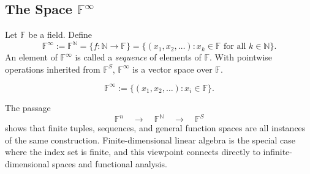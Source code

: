 \subsection{The Space $\mathbb{F}^{\infty}$}

\begin{definition}
\label{def:sequence-space}
Let $\mathbb{F}$ be a field. Define
\[
\mathbb{F}^{\infty}
:= \mathbb{F}^{\mathbb{N}}
= \{ f : \mathbb{N} \to \mathbb{F} \}
= \{ (x_1,x_2,\dots) : x_k \in \mathbb{F} \text{ for all } k \in \mathbb{N} \}.
\]
An element of $\mathbb{F}^{\infty}$ is called a \emph{sequence} of elements of $\mathbb{F}$.
With pointwise operations inherited from $\mathbb{F}^S$,
$\mathbb{F}^{\infty}$ is a vector space over $\mathbb{F}$.
\end{definition}

\begin{remark*}
\[ \mathbb{F}^\infty := \{(x_1,x_2,\ldots): x_i\in\mathbb{F}\}. \]
\end{remark*}

\begin{remark*}[Flash]
\end{remark*}

\begin{remark*}
The passage
\[
\mathbb{F}^n
\quad\longrightarrow\quad
\mathbb{F}^{\mathbb{N}}
\quad\longrightarrow\quad
\mathbb{F}^S
\]
shows that finite tuples, sequences, and general function spaces are all instances
of the same construction. Finite-dimensional linear algebra is the special case
where the index set is finite, and this viewpoint connects directly to
infinite-dimensional spaces and functional analysis.
\end{remark*}